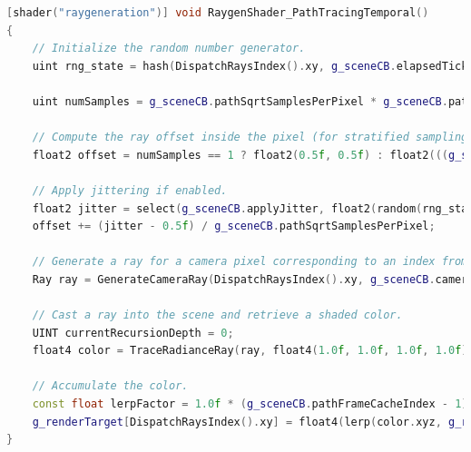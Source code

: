 \documentclass[12pt,a4paper]{report}
\numberwithin{equation}{section} %
\begin{document}
\begin{lstlisting}[caption={Generarea razelor în algoritmul Path Tracing progresiv},label={lst:raygen-progresiv},language=C++]
[shader("raygeneration")] void RaygenShader_PathTracingTemporal()
{
	// Initialize the random number generator.
	uint rng_state = hash(DispatchRaysIndex().xy, g_sceneCB.elapsedTicks);

	uint numSamples = g_sceneCB.pathSqrtSamplesPerPixel * g_sceneCB.pathSqrtSamplesPerPixel;

	// Compute the ray offset inside the pixel (for stratified sampling), between 0 and 1.
	float2 offset = numSamples == 1 ? float2(0.5f, 0.5f) : float2(((g_sceneCB.pathFrameCacheIndex - 1) % g_sceneCB.pathSqrtSamplesPerPixel + 0.5f) / g_sceneCB.pathSqrtSamplesPerPixel, (floor((g_sceneCB.pathFrameCacheIndex - 1) / g_sceneCB.pathSqrtSamplesPerPixel) + 0.5f) / g_sceneCB.pathSqrtSamplesPerPixel);

	// Apply jittering if enabled.
	float2 jitter = select(g_sceneCB.applyJitter, float2(random(rng_state), random(rng_state)), float2(0.5f, 0.5f)); // in [0, 1)
	offset += (jitter - 0.5f) / g_sceneCB.pathSqrtSamplesPerPixel;

	// Generate a ray for a camera pixel corresponding to an index from the dispatched 2D grid.
	Ray ray = GenerateCameraRay(DispatchRaysIndex().xy, g_sceneCB.cameraPosition.xyz, g_sceneCB.projectionToWorld, offset);

	// Cast a ray into the scene and retrieve a shaded color.
	UINT currentRecursionDepth = 0;
	float4 color = TraceRadianceRay(ray, float4(1.0f, 1.0f, 1.0f, 1.0f), float4(0.0f, 0.0f, 0.0f, 0.0f), currentRecursionDepth);

	// Accumulate the color.
	const float lerpFactor = 1.0f * (g_sceneCB.pathFrameCacheIndex - 1) / g_sceneCB.pathFrameCacheIndex;
	g_renderTarget[DispatchRaysIndex().xy] = float4(lerp(color.xyz, g_renderTarget[DispatchRaysIndex().xy].xyz, lerpFactor), 1.0f);
}
\end{lstlisting}
\end{document}
